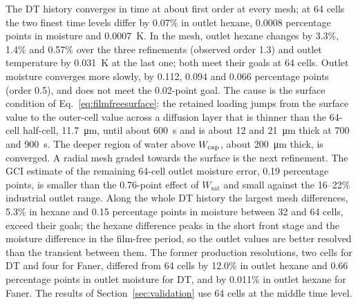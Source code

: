 The DT history converges in time at about first order at every mesh; at
64 cells the two finest time levels differ by 0.07\% in outlet hexane,
0.0008 percentage points in moisture and 0.0007~K. In the mesh, outlet
hexane changes by 3.3\%, 1.4\% and 0.57\% over the three refinements
(observed order 1.3) and outlet temperature by 0.031~K at the last one;
both meet their goals at 64 cells. Outlet moisture converges more slowly,
by 0.112, 0.094 and 0.066 percentage points (order 0.5), and does not
meet the 0.02-point goal. The cause is the surface condition of
Eq.~\eqref{eq:filmfreesurface}: the retained loading jumps from the
surface value to the outer-cell value across a diffusion layer that is
thinner than the 64-cell half-cell, \SI{11.7}{\micro\metre}, until about
600~s and is about 12 and \SI{21}{\micro\metre} thick at 700 and 900~s.
The deeper region of water above $W_{\mathrm{cap}}$, about \SI{200}{\micro\metre}
thick, is converged. A radial mesh graded towards the surface is the next
refinement. The GCI estimate of the remaining 64-cell outlet moisture error,
0.19 percentage points, is smaller than the 0.76-point effect of
$W_{\mathrm{sat}}$ and small against the 16--22\% industrial outlet range.
Along the whole DT history the largest mesh differences, 5.3\% in hexane
and 0.15 percentage points in moisture between 32 and 64 cells, exceed
their goals; the hexane difference peaks in the short front stage and the
moisture difference in the film-free period, so the outlet values are
better resolved than the transient between them. The former production resolutions,
two cells for DT and four for Faner, differed from 64 cells by 12.0\% in
outlet hexane and 0.66 percentage points in outlet moisture for DT, and by
0.011\% in outlet hexane for Faner. The results of
Section~\ref{sec:validation} use 64 cells at the middle time level.
